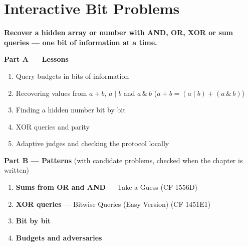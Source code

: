 \chapter{Interactive Bit Problems}
\label{ch:interactive}

\begin{tcolorbox}[enhanced, colback=white, colframe=secondaryblue, boxrule=1pt, arc=2mm]
\textbf{\large\textcolor{primaryblue}{Recover a hidden array or number with AND, OR, XOR or sum queries --- one bit of information at a time.}}
\end{tcolorbox}


\begin{plannedbox}
\textbf{Part A --- Lessons}
\begin{enumerate}[leftmargin=*, label=\textbf{A\arabic*.}, itemsep=1pt]
    \item Query budgets in bits of information
    \item Recovering values from $a+b$, $a \mid b$ and $a \,\&\, b$ ($a + b = (a \mid b) + (a \,\&\, b)$)
    \item Finding a hidden number bit by bit
    \item XOR queries and parity
    \item Adaptive judges and checking the protocol locally
\end{enumerate}
\textbf{Part B --- Patterns} (with candidate problems, checked when the chapter is written)
\begin{enumerate}[leftmargin=*, label=\textbf{P\arabic*.}, itemsep=1pt]
    \item \textbf{Sums from OR and AND} --- Take a Guess {\small\color{darkgray}(CF 1556D)}
    \item \textbf{XOR queries} --- Bitwise Queries (Easy Version) {\small\color{darkgray}(CF 1451E1)}
    \item \textbf{Bit by bit}
    \item \textbf{Budgets and adversaries}
\end{enumerate}
\end{plannedbox}
